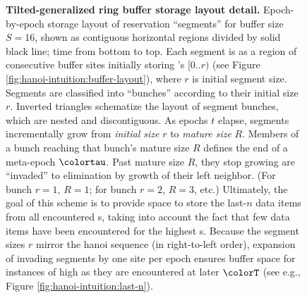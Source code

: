 \begin{figure}[htbp!]
\vspace{-1.5ex}

\caption{
    \textbf{Tilted-generalized ring buffer storage layout detail.}
    \footnotesize
    Epoch-by-epoch storage layout of \hv{} reservation ``segments''  for buffer size $S=16$, shown as contiguous horizontal regions divided by solid black line; time from bottom to top.
    Each segment is as a region of consecutive buffer sites initially storing \hv's $[0..r)$ (see Figure \ref{fig:hanoi-intuition:buffer-layout}), where $r$ is initial segment size.
    Segments are classified into ``bunches'' according to their initial size $r$.
    Inverted triangles schematize the layout of segment bunches, which are nested and discontiguous.
    As epochs $t$ elapse, segments incrementally grow from \textit{initial size} $r$ to \textit{mature size} $R$.
    Members of a bunch reaching that bunch's mature size $R$ defines the end of a meta-epoch $\colortau$.
    Past mature size $R$, they stop growing are ``invaded'' to elimination by growth of their left neighbor.
    (For bunch $r=1$, $R=1$; for bunch $r=2$, $R=3$, etc.)
    Ultimately, the goal of this scheme is to provide space to store the last-$n$ data items from all encountered \hv{}s, taking into account the fact that few data items have been encountered for the highest \hv{}s.
    Because the segment sizes $r$ mirror the hanoi sequence (in right-to-left order), expansion of invading segments by one site per epoch ensures buffer space for instances of high \hv{} as they are encountered at later $\colorT$ (see e.g., Figure \ref{fig:hanoi-intuition:last-n}).
  }
  \label{fig:hsurf-stretched-intuition}
\end{figure}

